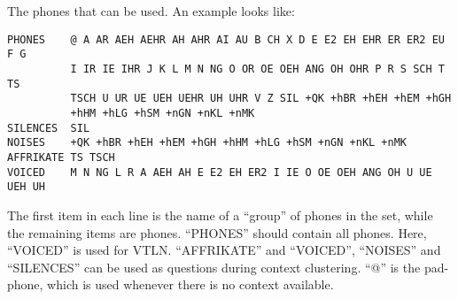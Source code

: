 
\section{}

The phones that can be used. An example looks like:

\begin{verbatim}
PHONES    @ A AR AEH AEHR AH AHR AI AU B CH X D E E2 EH EHR ER ER2 EU F G
          I IR IE IHR J K L M N NG O OR OE OEH ANG OH OHR P R S SCH T TS 
          TSCH U UR UE UEH UEHR UH UHR V Z SIL +QK +hBR +hEH +hEM +hGH 
          +hHM +hLG +hSM +nGN +nKL +nMK
SILENCES  SIL
NOISES    +QK +hBR +hEH +hEM +hGH +hHM +hLG +hSM +nGN +nKL +nMK
AFFRIKATE TS TSCH
VOICED    M N NG L R A AEH AH E E2 EH ER2 I IE O OE OEH ANG OH U UE UEH UH
\end{verbatim}

The first item in  each line is the name  of a ``group'' of phones  in
the  set, while the remaining    items are phones. ``PHONES''   should
contain all phones.  Here, ``VOICED'' is  used for VTLN. ``AFFRIKATE''
and  ``VOICED'', ``NOISES'' and  ``SILENCES'' can be used as questions
during  context  clustering. ``@''  is  the  pad-phone, which is  used
whenever there is no context available.

